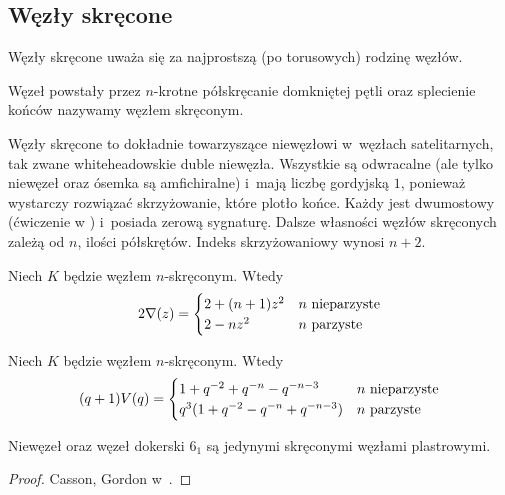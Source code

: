 
\subsection{Węzły skręcone}
%

Węzły skręcone uważa się za najprostszą (po torusowych) rodzinę węzłów.

\begin{definition}
    Węzeł powstały przez $n$-krotne półskręcanie domkniętej pętli oraz splecienie końców nazywamy węzłem skręconym.
\end{definition}

Węzły skręcone to dokładnie towarzyszące niewęzłowi w~węzłach satelitarnych, tak zwane whiteheadowskie duble niewęzła.
Wszystkie są odwracalne (ale tylko niewęzeł oraz ósemka są amfichiralne) i~mają liczbę gordyjską $1$, ponieważ wystarczy rozwiązać skrzyżowanie, które plotło końce.
%
Każdy jest dwumostowy (ćwiczenie w \cite[s. 114]{rolfsen76}) i~posiada zerową sygnaturę.
%
%
Dalsze własności węzłów skręconych zależą od $n$, ilości półskrętów.
Indeks skrzyżowaniowy wynosi $n + 2$.

\begin{proposition}
%
    Niech $K$ będzie węzłem $n$-skręconym.
    Wtedy
    \begin{equation}
    2 \nabla (z) = \begin{cases}
        2 + (n+1) z^{2} & n \mbox{ nieparzyste} \\
        2 - nz^2 & n \mbox{ parzyste}
    \end{cases}
    \end{equation}
\end{proposition}

\begin{proposition}
%
    Niech $K$ będzie węzłem $n$-skręconym.
    Wtedy
    \begin{equation}
    (q+1)V(q) = \begin{cases}
        1+q^{-2}+q^{-n}-q^{-n-3} & n \mbox{ nieparzyste} \\
        q^3(1+q^{-2}-q^{-n}+q^{-n-3}) & n \mbox{ parzyste}
    \end{cases}
    \end{equation}
\end{proposition}

\begin{proposition}
%
    Niewęzeł oraz węzeł dokerski $6_1$ są jedynymi skręconymi węzłami plastrowymi.
\end{proposition}

\begin{proof}
    Casson, Gordon w~\cite{casson86}.
\end{proof}

%



